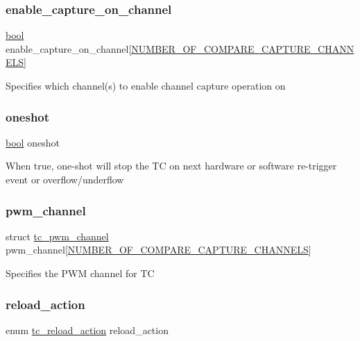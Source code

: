 \subsubsection{\texorpdfstring{enable\_capture\_on\_channel}{enable\_capture\_on\_channel}}
{\footnotesize\ttfamily \mbox{\hyperlink{group__group__sam0__utils_ga97a80ca1602ebf2303258971a2c938e2}{bool}} enable\+\_\+capture\+\_\+on\+\_\+channel\mbox{[}\mbox{\hyperlink{group__asfdoc__sam0__tc__group_gac837f9db5df1793578c195a979c6a9d3}{N\+U\+M\+B\+E\+R\+\_\+\+O\+F\+\_\+\+C\+O\+M\+P\+A\+R\+E\+\_\+\+C\+A\+P\+T\+U\+R\+E\+\_\+\+C\+H\+A\+N\+N\+E\+LS}}\mbox{]}}

Specifies which channel(s) to enable channel capture operation on \mbox{\label{structtc__config_a37dc77f178f39540e01854d81ff0607c}} 
\subsubsection{\texorpdfstring{oneshot}{oneshot}}
{\footnotesize\ttfamily \mbox{\hyperlink{group__group__sam0__utils_ga97a80ca1602ebf2303258971a2c938e2}{bool}} oneshot}

When {\ttfamily true}, one-\/shot will stop the TC on next hardware or software re-\/trigger event or overflow/underflow \mbox{\label{structtc__config_a457ab1c40216faa466b039961734b5e1}} 
\subsubsection{\texorpdfstring{pwm\_channel}{pwm\_channel}}
{\footnotesize\ttfamily struct \mbox{\hyperlink{structtc__pwm__channel}{tc\+\_\+pwm\+\_\+channel}} pwm\+\_\+channel\mbox{[}\mbox{\hyperlink{group__asfdoc__sam0__tc__group_gac837f9db5df1793578c195a979c6a9d3}{N\+U\+M\+B\+E\+R\+\_\+\+O\+F\+\_\+\+C\+O\+M\+P\+A\+R\+E\+\_\+\+C\+A\+P\+T\+U\+R\+E\+\_\+\+C\+H\+A\+N\+N\+E\+LS}}\mbox{]}}

Specifies the P\+WM channel for TC \mbox{\label{structtc__config_afbdfe6d99d0fd254c2cf61ecf212aa3f}} 
\subsubsection{\texorpdfstring{reload\_action}{reload\_action}}
{\footnotesize\ttfamily enum \mbox{\hyperlink{group__asfdoc__sam0__tc__group_ga204bb4814c91e62e56d9297c05280aad}{tc\+\_\+reload\+\_\+action}} reload\+\_\+action}

